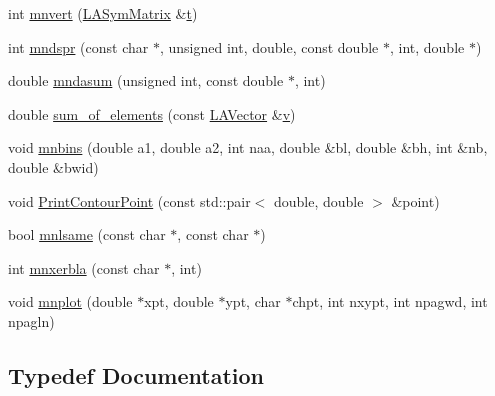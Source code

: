 \begin{DoxyCompactItemize}
int \mbox{\hyperlink{namespaceROOT_1_1Minuit2_a5e64c8eae56aaee62f3b683068e1148a}{mnvert}} (\mbox{\hyperlink{classROOT_1_1Minuit2_1_1LASymMatrix}{L\+A\+Sym\+Matrix}} \&\mbox{\hyperlink{adat__devel_2lib_2hadron_2hadron__timeslice_8cc_ac310d9181e916ba43604099aee272c71}{t}})
\item 
int \mbox{\hyperlink{namespaceROOT_1_1Minuit2_acc89c3c759da8dc191d0a862e354a555}{mndspr}} (const char $\ast$, unsigned int, double, const double $\ast$, int, double $\ast$)
\item 
double \mbox{\hyperlink{namespaceROOT_1_1Minuit2_a6945787dc86a55296d0de1bf1fefc508}{mndasum}} (unsigned int, const double $\ast$, int)
\item 
double \mbox{\hyperlink{namespaceROOT_1_1Minuit2_a30e3cb02f21de446d5a4611ef1e8becd}{sum\+\_\+of\+\_\+elements}} (const \mbox{\hyperlink{classROOT_1_1Minuit2_1_1LAVector}{L\+A\+Vector}} \&\mbox{\hyperlink{adat__devel_2lib_2hadron_2hadron__timeslice_8cc_a716fc87f5e814be3ceee2405ed6ff22a}{v}})
\item 
void \mbox{\hyperlink{namespaceROOT_1_1Minuit2_ac22433ee68c6274fa7028a58763d04bd}{mnbins}} (double a1, double a2, int naa, double \&bl, double \&bh, int \&nb, double \&bwid)
\item 
void \mbox{\hyperlink{namespaceROOT_1_1Minuit2_a4075583a4cbc4a719ed2ec32e1d76bbf}{Print\+Contour\+Point}} (const std\+::pair$<$ double, double $>$ \&point)
\item 
bool \mbox{\hyperlink{namespaceROOT_1_1Minuit2_a3f90b826c2c1b4313f9a90c22b8ee657}{mnlsame}} (const char $\ast$, const char $\ast$)
\item 
int \mbox{\hyperlink{namespaceROOT_1_1Minuit2_a6c2d97c42f0b3f75b7370ae5e6f2c638}{mnxerbla}} (const char $\ast$, int)
\item 
void \mbox{\hyperlink{namespaceROOT_1_1Minuit2_a2c786d8330736525f0757ba1848f5bc4}{mnplot}} (double $\ast$xpt, double $\ast$ypt, char $\ast$chpt, int nxypt, int npagwd, int npagln)
\end{DoxyCompactItemize}


\subsection{Typedef Documentation}
\mbox{\label{namespaceROOT_1_1Minuit2_a9e74ad97f5537a2e80e52b04d98ecc6e}} 
